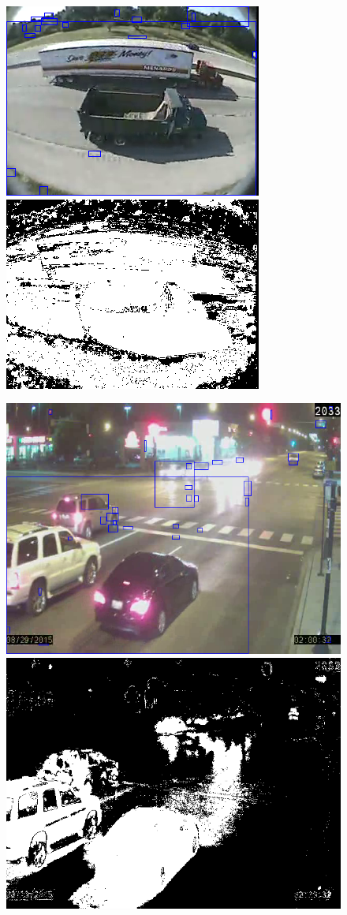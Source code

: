 \begin{figure}[!htbp]
\centering
    \begin{minipage}{0.96\columnwidth}
        \includegraphics[width=0.48\linewidth, height = 0.3\linewidth]{./img/bg/252707.png}
        \includegraphics[width=0.48\linewidth, height = 0.3\linewidth]{./img/bg/252707_FG.png}
        \label{subfig:bg-autoExposure}
    \end{minipage}
    \hspace{0.02\columnwidth}
    \begin{minipage}{0.96\columnwidth}
        \includegraphics[width=0.48\linewidth, height = 0.3\linewidth]{./img/bg/ciceroPeterson.png}
        \includegraphics[width=0.48\linewidth, height = 0.3\linewidth]{./img/bg/ciceroPeterson_FG.png}
        \label{subfig:bg-illuminationChange}

\end{minipage}
\end{figure}
